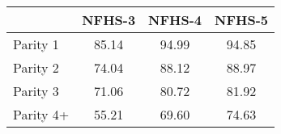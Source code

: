 {
\def\sym#1{\ifmmode^{#1}\else\(^{#1}\)\fi}
\begin{tabular}{l*{3}{c}}
\hline\hline
            &\multicolumn{1}{c}{NFHS-3}&\multicolumn{1}{c}{NFHS-4}&\multicolumn{1}{c}{NFHS-5}\\
\hline
\hline
Parity 1    &       85.14         &       94.99         &       94.85         \\
Parity 2    &       74.04         &       88.12         &       88.97         \\
Parity 3    &       71.06         &       80.72         &       81.92         \\
Parity 4+   &       55.21         &       69.60         &       74.63         \\
\hline\hline

\end{tabular}
}
